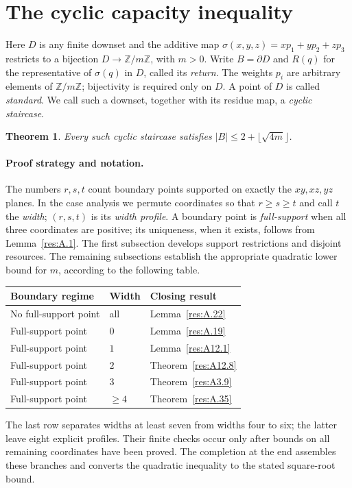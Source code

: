 \documentclass[11pt]{article}
\newtheorem{theorem}{Theorem}[section]
\theoremstyle{definition}
\theoremstyle{remark}
\theoremstyle{plain}
\begin{document}
\section{The cyclic capacity inequality}\label{sec:capacity}
Here $D$ is any finite downset and the additive map
$\sigma(x,y,z)=xp_1+yp_2+zp_3$ restricts to a bijection
$D\to\mathbb Z/m\mathbb Z$, with $m>0$.
Write $B=\partial D$ and $R(q)$ for the representative of $\sigma(q)$
in $D$, called its \emph{return}. The weights $p_i$ are arbitrary
elements of $\mathbb Z/m\mathbb Z$; bijectivity is required only on $D$.
A point of $D$ is called \emph{standard}. We call such a downset, together
with its residue map, a \emph{cyclic staircase}.

\begin{theorem}\label{thm:capacity}
Every such cyclic staircase satisfies
$|B|\le2+\lfloor\sqrt{4m}\rfloor$.
\end{theorem}


\paragraph{Proof strategy and notation.}
The numbers $r,s,t$ count boundary points supported on exactly the
$xy,xz,yz$ planes. In the case analysis we permute coordinates so that
$r\ge s\ge t$ and call $t$ the \emph{width}; $(r,s,t)$ is its
\emph{width profile}. A boundary point is
\emph{full-support} when all three coordinates are positive; its
uniqueness, when it exists, follows from Lemma~\ref{res:A.1}.
The first subsection develops support restrictions and disjoint
resources. The remaining subsections establish the appropriate quadratic
lower bound for $m$, according to the following table.
\begin{center}
\begin{tabular}{@{}lll@{}}\toprule
Boundary regime&Width&Closing result\\\midrule
No full-support point&all&Lemma~\ref{res:A.22}\\
Full-support point&$0$&Lemma~\ref{res:A.19}\\
Full-support point&$1$&Lemma~\ref{res:A12.1}\\
Full-support point&$2$&Theorem~\ref{res:A12.8}\\
Full-support point&$3$&Theorem~\ref{res:A3.9}\\
Full-support point&$\ge4$&Theorem~\ref{res:A.35}\\\bottomrule
\end{tabular}
\end{center}
The last row separates widths at least seven from widths four to six;
the latter leave eight explicit profiles. Their finite checks occur only
after bounds on all remaining coordinates have been proved.
The completion at the end assembles these branches and converts the
quadratic inequality to the stated square-root bound.
\end{document}
